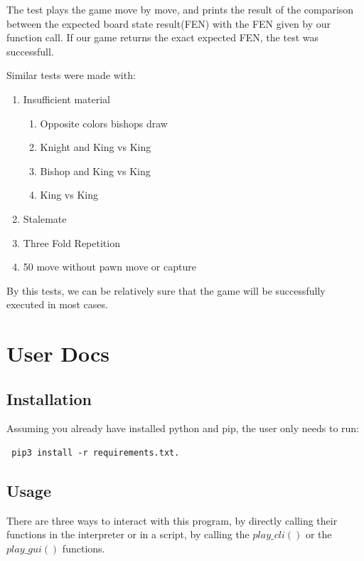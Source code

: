 \documentclass[10pt]{article}
\begin{document}
The test plays the game move by move, and prints the result of the comparison between the expected board state
result(FEN) with the FEN given by our function call. If our game returns the
exact expected FEN, the test was successfull.

Similar tests were made with:
\begin{enumerate}[label=\arabic*)]
\item Insufficient material
    \begin{enumerate}[label=\arabic{enumii}.\arabic*)]
    \item Opposite colors bishops draw
    \item Knight and King vs King
    \item Bishop and King vs King
    \item King vs King
    \end{enumerate}
    
    \item Stalemate 
    \item Three Fold Repetition
    \item 50 move without pawn move or capture
\end{enumerate}

By this tests, we can be relatively sure that the game will be successfully
executed in most cases.



\section{User Docs}

\subsection{Installation}

Assuming you already have installed python and pip, the user only needs to run:
\begin{lstlisting}
 pip3 install -r requirements.txt.
\end{lstlisting}

\subsection{Usage}

There are three ways to interact with this program, by directly calling their
functions in the interpreter or in a script, by calling the $play\_cli()$ or the
$play\_gui()$ functions. 
\end{document}
